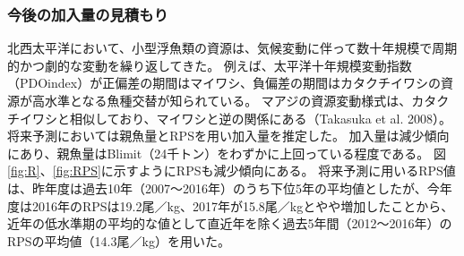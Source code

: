 \subsubsection{今後の加入量の見積もり}
北西太平洋において、小型浮魚類の資源は、気候変動に伴って数十年規模で周期的かつ劇的な変動を繰り返してきた。
例えば、太平洋十年規模変動指数（PDOindex）が正偏差の期間はマイワシ、負偏差の期間はカタクチイワシの資源が高水準となる魚種交替が知られている。
マアジの資源変動様式は、カタクチイワシと相似しており、マイワシと逆の関係にある（Takasuka et al. 2008）。
将来予測においては親魚量とRPSを用い加入量を推定した。
加入量は減少傾向にあり、親魚量はBlimit（24千トン）をわずかに上回っている程度である。
図\ref{fig:R}、\ref{fig:RPS}に示すようにRPSも減少傾向にある。
将来予測に用いるRPS値は、昨年度は過去10年（2007～2016年）のうち下位5年の平均値としたが、今年度は2016年のRPSは19.2尾／kg、2017年が15.8尾／kgとやや増加したことから、近年の低水準期の平均的な値として直近年を除く過去5年間（2012～2016年）のRPSの平均値（14.3尾／kg）を用いた。


